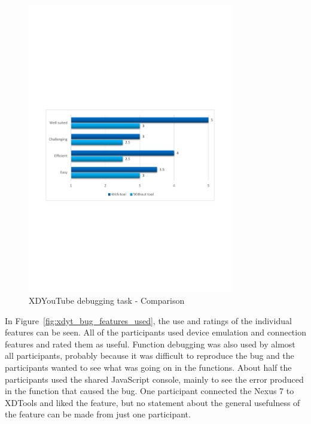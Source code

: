\begin{figure}[H]
  \centering
    \includegraphics[width=0.8\textwidth]{images/charts/xdyt_bug_comparison.pdf}
	\caption[xdyt-bug: Comparison]{XDYouTube debugging task - Comparison}
	\label{fig:xdyt_bug_comparison}
\end{figure}

In Figure~\ref{fig:xdyt_bug_features_used}, the use and ratings of the individual features can be seen. All of the participants used device emulation and connection features and rated them as useful. Function debugging was also used by almost all participants, probably because it was difficult to reproduce the bug and the participants wanted to see what was going on in the functions. About half the participants used the shared JavaScript console, mainly to see the error produced in the function that caused the bug. One participant connected the Nexus 7 to XDTools and liked the feature, but no statement about the general usefulness of the feature can be made from just one participant. 

